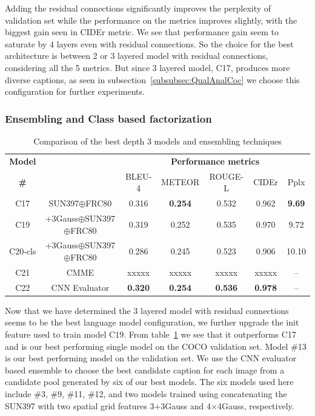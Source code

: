 Adding the residual connections significantly improves the perplexity of
validation set while the performance on the metrics improves slightly, with the
biggest gain seen in CIDEr metric.
We see that performance gain seem to saturate by 4 layers even with residual
connections.
So the choice for the best architecture is between 2 or 3 layered model with
residual connections, considering all the 5 metrics.
But since 3 layered model, C17, produces more diverse captions, as seen in
subsection~\ref{subsubsec:QualAnalCoc} we choose this configuration for further
experiments.

\subsubsection{Ensembling and Class based factorization}
\begin{table}[htp]
  \centering
  \newcommand{\bs}{\small}
  \begin{adjustbox}{center}
  \begin{tabular}{|c|c|c|c|c|c|c|}
    \hline
    \bf Model & \bf \multirow{2}{*}{Init Feature} & \multicolumn{5}{c|}{\bf Performance metrics}\\
    \cline{3-7}
    \bf \# &\bf &\bs BLEU-4 &\bs METEOR &\bs ROUGE-L &\bs CIDEr&\bs Pplx \\\hline
    C17 & SUN397$\oplus$FRC80& 0.316 &\bf0.254&0.532 & 0.962   &\bf9.69 \\
    C19 &\parbox[c][][c]{4cm}{\smallskip{}+3Gauss$\oplus$SUN397\\$\oplus$FRC80\smallskip} 
                             & 0.319 & 0.252 & 0.535 & 0.970 & 9.72 \\\hline
    C20-cls &\parbox[c][][c]{4cm}{\smallskip{}+3Gauss$\oplus$SUN397\\$\oplus$FRC80\smallskip} 
                             & 0.286 & 0.245 & 0.523 & 0.906 & 10.10 \\\hline
    C21& CMME                & xxxxx & xxxxx & xxxxx & xxxxx & -- \\
    C22& CNN Evaluator       &\bf0.320&\bf0.254 &\bf0.536 &\bf0.978 & -- \\\hline
  \end{tabular}
  \end{adjustbox}
  \caption{Comparison of the best depth 3 models and ensembling techniques}
  \label{tab:resfinalCocValset}
\end{table}

Now that we have determined the 3 layered model with residual connections seems to
be the best language model configuration, we further upgrade the init feature
used to train model C19.
From table~\ref{tab:resfinalCocValset} we see that it outperforms C17 and is our
best performing single model on the COCO validation set.
Model \#13 is our best performing model on the validation set. 
We use the CNN evaluator based ensemble to choose the best candidate caption for
each image from a candidate pool generated by six of our best models.
The six models used here include \#3, \#9, \#11, \#12, and two models trained
using concatenating the SUN397 with two spatial grid features 3+3Gauss and
4$\times$4Gauss, respectively.


